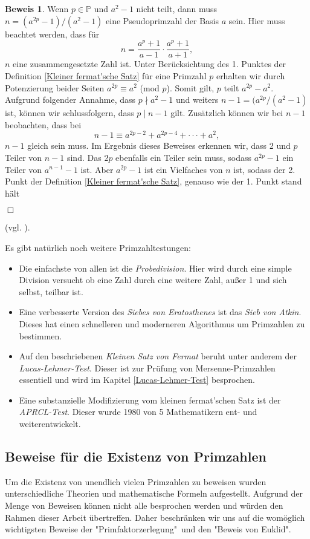 \documentclass[12pt,a4paper]{article}
\theoremstyle{definition}
\newtheorem{beweis}{Beweis}[subsection]
\begin{document}
\begin{beweis}
Wenn $p \in \mathbb{P}$ und $a^2-1$ nicht teilt, dann muss $n = (a^{2p}-1)/(a^2-1)$ eine Pseudoprimzahl der Basis $a$ sein.
Hier muss beachtet werden, dass für
\[n = \frac {a^p + 1} {a - 1} \cdot \frac {a^p + 1} {a + 1},\]
$n$ eine zusammengesetzte Zahl ist.
Unter Berücksichtung des 1. Punktes der Definition \ref{Kleiner fermat'sche Satz} für eine Primzahl $p$ erhalten wir durch Potenzierung beider Seiten $a^{2p} \equiv a^2$ (mod $p$).
Somit gilt, $p$ teilt $a^{2p} - a^2$.
Aufgrund folgender Annahme, dass $p \nmid a^2 - 1$ und weiters $n - 1 = (a^{2p} / (a^2 - 1)$ ist, können wir schlussfolgern, dass $p \mid n - 1$ gilt.
Zusätzlich können wir bei $n - 1$ beobachten, dass bei
\[n - 1 \equiv a^{2p-2} + a^{2p-4} + \cdot\cdot\cdot + a^2,\]
$n - 1$ gleich sein muss.
Im Ergebnis dieses Beweises erkennen wir, dass 2 und $p$ Teiler von $n - 1$ sind.
Das $2p$ ebenfalls ein Teiler sein muss, sodass $a^{2p} - 1$ ein Teiler von $a^{n-1} - 1$ ist.
Aber $a^{2p} - 1$ ist ein Vielfaches von $n$ ist, sodass der 2. Punkt der Definition \ref{Kleiner fermat'sche Satz}, genauso wie der 1. Punkt stand hält
\begin{flushright}
$\Box$
\end{flushright}
\end{beweis}
(vgl. \cite[131--133]{Crandall2005}).

Es gibt natürlich noch weitere Primzahltestungen:
\begin{itemize}
    \item Die einfachste von allen ist die \textit{Probedivision}.
    Hier wird durch eine simple Division versucht ob eine Zahl durch eine weitere Zahl, außer 1 und sich selbst, teilbar ist.
    \item Eine verbesserte Version des \textit{Siebes von Eratosthenes} ist das \textit{Sieb von Atkin}.
    Dieses hat einen schnelleren und moderneren Algorithmus um Primzahlen zu bestimmen.
    \item Auf den beschriebenen \textit{Kleinen Satz von Fermat} beruht unter anderem der \textit{Lucas-Lehmer-Test}.
    Dieser ist zur Prüfung von Mersenne-Primzahlen essentiell und wird im Kapitel \ref{Lucas-Lehmer-Test} besprochen.
    \item Eine substanzielle Modifizierung vom kleinen fermat'schen Satz ist der \textit{APRCL-Test}.
    Dieser wurde 1980 von 5 Mathematikern ent- und weiterentwickelt.
\end{itemize}

\subsection{Beweise für die Existenz von Primzahlen}\label{Beweise für die Existenz von Primzahlen}
Um die Existenz von unendlich vielen Primzahlen zu beweisen wurden unterschiedliche Theorien und mathematische Formeln aufgestellt.
Aufgrund der Menge von Beweisen können nicht alle besprochen werden und würden den Rahmen dieser Arbeit übertreffen.
Daher beschränken wir uns auf die womöglich wichtigsten Beweise der "Primfaktorzerlegung"\ und den "Beweis von Euklid".
\end{document}
